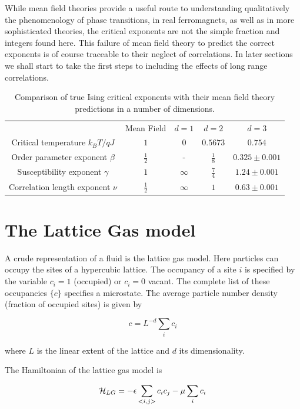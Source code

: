 \documentclass[
  letterpaper,
  enabledeprecatedfontcommands]{report}
\begin{document}
While mean field theories provide a useful route to understanding
qualitatively the phenomenology of phase transitions, in real
ferromagnets, as well as in more sophisticated theories, the critical
exponents are not the simple fraction and integers found here. This
failure of mean field theory to predict the correct exponents is of
course traceable to their neglect of correlations. In later sections we
shall start to take the first steps to including the effects of long
range correlations.

\label{tab-exponents}
\begin{longtable}[]{@{}ccccc@{}}
\caption{Comparison of true Ising critical exponents with their mean
field theory predictions in a number of dimensions.}\tabularnewline
\toprule\noalign{}
\endfirsthead
\endhead
\bottomrule\noalign{}
\endlastfoot
\(\:\) & Mean Field & \(d=1\) & \(d=2\) & \(d=3\) \\
Critical temperature \(k_BT/qJ\) & \(1\) & \(0\) & \(0.5673\) &
\(0.754\) \\
Order parameter exponent \(\beta\) & \(\frac{1}{2}\) & - &
\(\frac{1}{8}\) & \(0.325 \pm 0.001\) \\
Susceptibility exponent \(\gamma\) & \(1\) & \(\infty\) &
\(\frac{7}{4}\) & \(1.24 \pm 0.001\) \\
Correlation length exponent \(\nu\) & \(\frac{1}{2}\) & \(\infty\) &
\(1\) & \(0.63\pm 0.001\) \\
\end{longtable}

\chapter{The Lattice Gas model}\label{the-lattice-gas-model}

A crude representation of a fluid is the lattice gas model. Here
particles can occupy the sites of a hypercubic lattice. The occupancy of
a site \(i\) is specified by the variable \(c_i=1\) (occupied) or
\(c_i=0\) vacant. The complete list of these occupancies \(\{c\}\)
specifies a microstate. The average particle number density (fraction of
occupied sites) is given by

\[c=L^{-d}\sum_i c_i \]

where \(L\) is the linear extent of the lattice and \(d\) its
dimensionality.

The Hamiltonian of the lattice gas model is

\[{\cal H}_{LG}=-\epsilon\sum_{<i,j>}c_ic_j - \mu\sum_ic_i\]
\end{document}
